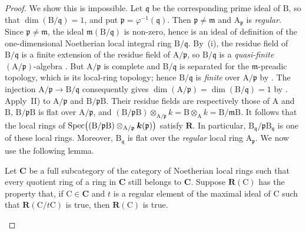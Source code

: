 \begin{proof}
We show this is impossible. Let $\mathfrak{q}$ be the corresponding prime ideal of $\mathrm{B}$, so that $\dim(\mathrm{B}/\mathfrak{q})=1$, and put $\mathfrak{p}=\varphi^{-1}(\mathfrak{q})$. Then $\mathfrak{p}\neq\mathfrak{m}$ and $\mathrm{A}_\mathfrak{p}$ is \emph{regular}. Since $\mathfrak{p}\neq\mathfrak{m}$, the ideal $\mathfrak{m}(\mathrm{B}/\mathfrak{q})$ is non-zero, hence is an ideal of definition of the one-dimensional Noetherian local integral ring $\mathrm{B}/\mathfrak{q}$. By~(i), the residue field of $\mathrm{B}/\mathfrak{q}$ is a finite extension of the residue field of $\mathrm{A}/\mathfrak{p}$, so $\mathrm{B}/\mathfrak{q}$ is a \emph{quasi-finite} $(\mathrm{A}/\mathfrak{p})$-algebra . But $\mathrm{A}/\mathfrak{p}$ is complete and $\mathrm{B}/\mathfrak{q}$ is separated for the $\mathfrak{m}$-preadic topology, which is its local-ring topology; hence $\mathrm{B}/\mathfrak{q}$ is \emph{finite} over $\mathrm{A}/\mathfrak{p}$ by . The injection $\mathrm{A}/\mathfrak{p}\to\mathrm{B}/\mathfrak{q}$ consequently gives $\dim(\mathrm{A}/\mathfrak{p})=\dim(\mathrm{B}/\mathfrak{q})=1$
by . Apply~II) to $\mathrm{A}/\mathfrak{p}$ and $\mathrm{B}/\mathfrak{p}\mathrm{B}$. Their residue fields are respectively those of $\mathrm{A}$ and $\mathrm{B}$, $\mathrm{B}/\mathfrak{p}\mathrm{B}$ is flat over $\mathrm{A}/\mathfrak{p}$, and $(\mathrm{B}/\mathfrak{p}\mathrm{B})\otimes_{\mathrm{A}/\mathfrak{p}}k
=\mathrm{B}\otimes_\mathrm{A}k=\mathrm{B}/\mathfrak{m}\mathrm{B}$.
It follows that the local rings of $\operatorname{Spec}\bigl((\mathrm{B}/\mathfrak{p}\mathrm{B})\otimes_{\mathrm{A}/\mathfrak{p}}\boldsymbol{k}(\mathfrak{p})\bigr)$
satisfy $\boldsymbol{R}$. In particular, $\mathrm{B}_\mathfrak{q}/\mathfrak{p}\mathrm{B}_\mathfrak{q}$ is one of these local rings. Moreover, $\mathrm{B}_\mathfrak{q}$ is flat over the \emph{regular} local ring $\mathrm{A}_\mathfrak{p}$. We now use the following lemma.

\begin{lemma}[7.5.1.1]
\label{IV.7.5.1.1}
Let $\boldsymbol{C}$ be a full subcategory of the category of Noetherian local rings such that every quotient ring of a ring in $\boldsymbol{C}$ still belongs to $\boldsymbol{C}$. Suppose $\boldsymbol{R}(\mathrm{C})$ has the property that, if $\mathrm{C}\in\boldsymbol{C}$ and $t$ is a regular element of the maximal ideal of $\mathrm{C}$ such that $\boldsymbol{R}(\mathrm{C}/t\mathrm{C})$ is true, then $\boldsymbol{R}(\mathrm{C})$ is true.


\end{lemma}
\end{proof}
